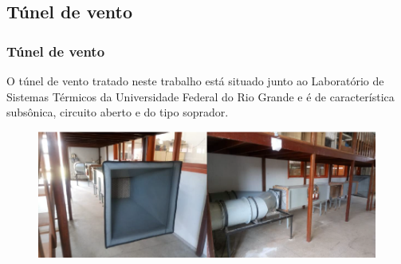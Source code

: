 \subsection{Túnel de vento}

%
%
%

\begin{frame}
\frametitle{Túnel de vento}

O túnel de vento tratado neste trabalho está situado junto ao Laboratório de Sistemas Térmicos da Universidade Federal do Rio Grande e é de característica subsônica, circuito aberto e do tipo soprador.

\begin{figure}
\centering
\includegraphics[scale = 0.4]{figuras/tunelfran}
\end{figure}

\end{frame}
